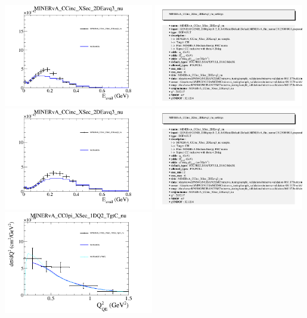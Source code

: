 \documentclass{article}
\begin{document}
\centering
\includegraphics[width=0.49\textwidth]{figures/nuisance_MINERvA_CCinc_XSec_2DEavq3_nu_slice_4_comp.png}
\includegraphics[width=0.49\textwidth]{figures/nuisance_MINERvA_CCinc_XSec_2DEavq3_nu_info.png}
\centering
\includegraphics[width=0.49\textwidth]{figures/nuisance_MINERvA_CCinc_XSec_2DEavq3_nu_slice_5_comp.png}
\includegraphics[width=0.49\textwidth]{figures/nuisance_MINERvA_CCinc_XSec_2DEavq3_nu_info.png}
\centering
\includegraphics[width=0.49\textwidth]{figures/nuisance_MINERvA_CC0pi_XSec_1DQ2_TgtC_nu_comp.png}
\end{document}
